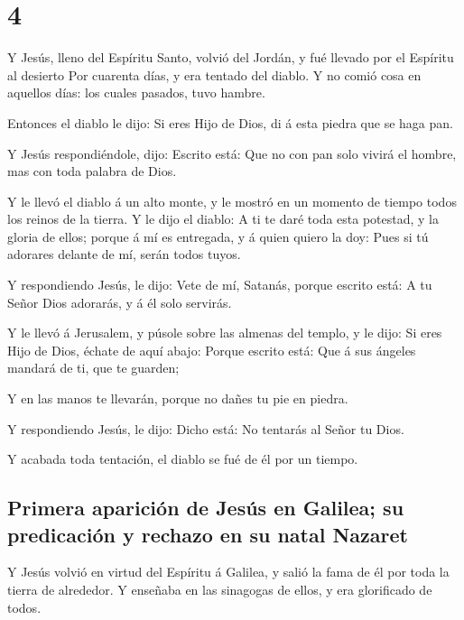 \hypertarget{section-42-4}{%
\section{4}\label{section-42-4}}

 Y Jesús, lleno del Espíritu Santo, volvió del Jordán, y
fué llevado por el Espíritu al desierto  Por cuarenta
días, y era tentado del diablo. Y no comió cosa en aquellos días: los
cuales pasados, tuvo hambre.

 Entonces el diablo le dijo: Si eres Hijo de Dios, di á
esta piedra que se haga pan.

 Y Jesús respondiéndole, dijo: Escrito está: Que no con
pan solo vivirá el hombre, mas con toda palabra de Dios.

 Y le llevó el diablo á un alto monte, y le mostró en un
momento de tiempo todos los reinos de la tierra.  Y le
dijo el diablo: A ti te daré toda esta potestad, y la gloria de ellos;
porque á mí es entregada, y á quien quiero la doy:  Pues
si tú adorares delante de mí, serán todos tuyos.

 Y respondiendo Jesús, le dijo: Vete de mí, Satanás,
porque escrito está: A tu Señor Dios adorarás, y á él solo servirás.

 Y le llevó á Jerusalem, y púsole sobre las almenas del
templo, y le dijo: Si eres Hijo de Dios, échate de aquí abajo:
 Porque escrito está: Que á sus ángeles mandará de ti,
que te guarden;

 Y en las manos te llevarán, porque no dañes tu pie en
piedra.

 Y respondiendo Jesús, le dijo: Dicho está: No tentarás
al Señor tu Dios.

 Y acabada toda tentación, el diablo se fué de él por un
tiempo.

\hypertarget{primera-apariciuxf3n-de-jesuxfas-en-galilea-su-predicaciuxf3n-y-rechazo-en-su-natal-nazaret}{%
\subsection{Primera aparición de Jesús en Galilea; su predicación y
rechazo en su natal
Nazaret}\label{primera-apariciuxf3n-de-jesuxfas-en-galilea-su-predicaciuxf3n-y-rechazo-en-su-natal-nazaret}}

 Y Jesús volvió en virtud del Espíritu á Galilea, y salió
la fama de él por toda la tierra de alrededor.  Y
enseñaba en las sinagogas de ellos, y era glorificado de todos.


